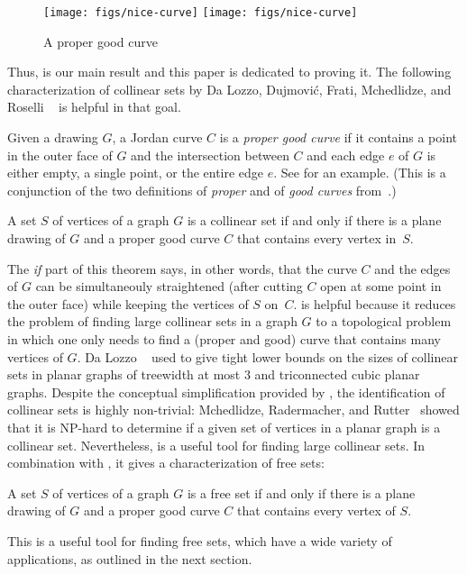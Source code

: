 \begin{figure}[tb]
  \centering
  \ifSODA
  \texttt{[image: figs/nice-curve]}
  \else
  \texttt{[image: figs/nice-curve]}
  \fi
  \caption{A proper good curve}
  \label{fig:proper-good}
\end{figure}


Thus,  is our main result and this paper is dedicated to
proving it. The following
characterization of collinear sets by Da Lozzo,
Dujmovi\'c, Frati, Mchedlidze, and Roselli%
~\cite{dalozzo.dujmovic.ea:drawing}  is helpful in that goal.

\begin{defn}
\label{proper-good}
  Given a drawing $G$,
  a
  Jordan curve $C$ is a \emph{proper good curve} 
  if it contains a point in the outer face
of $G$ and the intersection between $C$ and each edge $e$ of $G$ is
either empty, a single point, or the entire edge $e$.  
See  for an example.
\textup(This is a conjunction of the two definitions of
\emph{proper} and of \emph{good curves}
from~\cite{dalozzo.dujmovic.ea:drawing}.\textup)
\end{defn}

\begin{thm}\cite{dalozzo.dujmovic.ea:drawing} 
  A set $S$ of vertices of a graph $G$ is a collinear set if and
  only if there is a plane drawing of $G$ and a proper good curve $C$
  that contains every vertex in~$S$.
\end{thm}

The \emph{if} part of this theorem says, in other words, that the
curve $C$ and the edges of $G$ can be simultaneouly straightened
 (after cutting $C$ open at
some point in the outer face)
while keeping the vertices of $S$ on~$C$.
%
  is helpful because it reduces the problem of
finding large collinear sets in a graph $G$ to a topological problem in
which one only needs to find a (proper and good) curve that contains many vertices
of $G$.  Da Lozzo \etal~\cite{dalozzo.dujmovic.ea:drawing}
 used  to give
tight lower bounds on the sizes of collinear sets in planar graphs
of treewidth at most 3 and triconnected cubic planar graphs. Despite the conceptual simplification provided by ,
the identification of collinear sets is highly non-trivial:
Mchedlidze, Radermacher, and Rutter~%
\cite{mchedlidze.radermacher.ea:aligned} showed that it is NP-hard to
determine if a given set of vertices in a planar graph is a collinear
set.
%
Nevertheless,  is a useful tool for finding large 
collinear sets. In combination with , it gives a
characterization of free sets:
\begin{cor}
	A set $S$ of vertices of a graph $G$ is a free set if and
	only if there is a plane drawing of $G$ and a proper good curve $C$
	that contains every vertex of $S$.
      \end{cor}
This is a useful
tool for finding free sets, which have a wide variety of applications,
as outlined in the next section.


